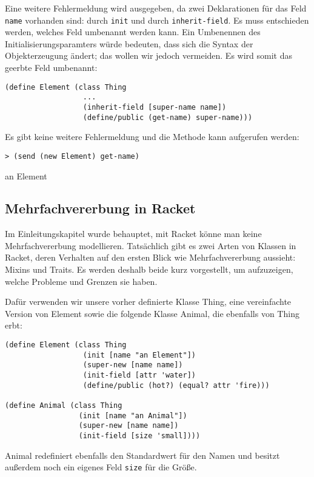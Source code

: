 Eine weitere Fehlermeldung wird ausgegeben, da zwei Deklarationen für das Feld \texttt{name} vorhanden sind: durch \texttt{init} und durch \texttt{inherit-field}. Es muss entschieden werden, welches Feld umbenannt werden kann. Ein Umbenennen des Initialisierungsparamters würde bedeuten, dass sich die Syntax der Objekterzeugung ändert; das wollen wir jedoch vermeiden. Es wird somit das geerbte Feld umbenannt:

\begin{lstlisting}
(define Element (class Thing 
                  ...
                  (inherit-field [super-name name])
                  (define/public (get-name) super-name)))
\end{lstlisting}

Es gibt keine weitere Fehlermeldung und die Methode kann aufgerufen werden:

\begin{lstlisting}
> (send (new Element) get-name)
\end{lstlisting}
{\routput {\qq}an Element\qq}

\subsection{Mehrfachvererbung in Racket}
\label{mixins}
Im Einleitungskapitel wurde behauptet, mit Racket könne man keine Mehrfachvererbung modellieren. Tatsächlich gibt es zwei Arten von Klassen in Racket, deren Verhalten auf den ersten Blick wie Mehrfachvererbung aussieht: Mixins und Traits. Es werden deshalb beide kurz vorgestellt, um aufzuzeigen, welche Probleme und Grenzen sie haben.

Dafür verwenden wir unsere vorher definierte Klasse Thing, eine vereinfachte Version von Element sowie die folgende Klasse Animal, die ebenfalls von Thing erbt:

\begin{lstlisting}
(define Element (class Thing 
                  (init [name "an Element"])
                  (super-new [name name])
                  (init-field [attr 'water])
                  (define/public (hot?) (equal? attr 'fire)))

(define Animal (class Thing
                 (init [name "an Animal"])
                 (super-new [name name])
                 (init-field [size 'small])))
\end{lstlisting}

Animal redefiniert ebenfalls den Standardwert für den Namen und besitzt außerdem noch ein eigenes Feld \texttt{size} für die Größe.

